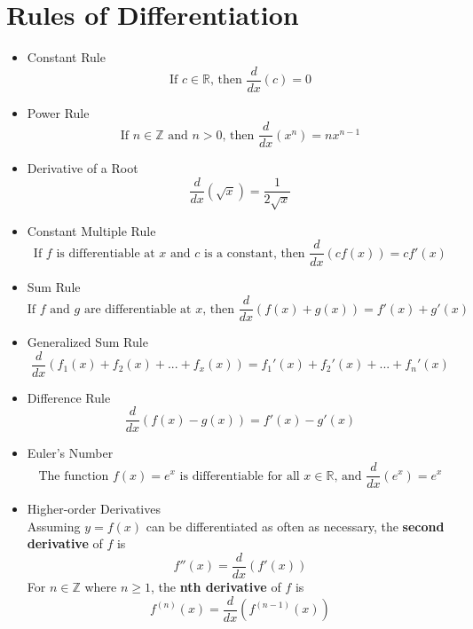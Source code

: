 \documentclass{article}
\begin{document}
\section*{Rules of Differentiation}
\begin{itemize}
    \item Constant Rule
    $$\text{If } c \in \mathbb{R} \text{, then } \frac{d}{dx}\left(c\right) = 0$$
    \item Power Rule
    $$\text{If } n \in \mathbb{Z} \text{ and } n > 0 \text{, then } \frac{d}{dx}\left(x^n\right) = nx^{n - 1}$$
    \item Derivative of a Root
    $$\frac{d}{dx}\left(\sqrt{x}\right) = \frac{1}{2\sqrt{x}}$$
    \item Constant Multiple Rule
    $$\text{If } f \text{ is differentiable at } x \text{ and } c \text{ is a constant, then } \frac{d}{dx}\left(cf(x)\right) = cf'\left(x\right)$$
    \item Sum Rule
    $$\text{If } f \text{ and } g \text{ are differentiable at } x \text{, then } \frac{d}{dx}\left(f(x) + g(x)\right) = f'(x) + g'(x)$$
    \item Generalized Sum Rule
    $$\frac{d}{dx}\left(f_1(x) + f_2(x) + ... + f_x(x)\right) = f_1'(x) + f_2'(x) + ... + f_n'(x)$$
    \item Difference Rule
    $$\frac{d}{dx}\left(f(x) - g(x)\right) = f'(x) - g'(x)$$
    \item Euler's Number
        $$\text{The function } f(x) = e^x \text{ is differentiable for all } x \in \mathbb{R} \text{, and } \frac{d}{dx}\left(e^x\right) = e^x$$
    \item Higher-order Derivatives
    \\ Assuming $y = f(x)$ can be differentiated as often as necessary, the \textbf{second derivative} of $f$ is
    $$f''(x) = \frac{d}{dx}\left(f'(x)\right)$$
    For $n \in \mathbb{Z}$ where $n \geq 1$, the \textbf{nth derivative} of $f$ is
    $$f^{(n)}\left(x\right) = \frac{d}{dx}\left(f^{(n - 1)}\left(x\right)\right)$$
\end{itemize}
\end{document}
